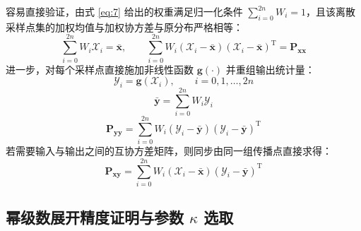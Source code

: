 容易直接验证，由式 \eqref{eq:7} 给出的权重满足归一化条件 $\sum_{i=0}^{2n} W_i = 1$，且该离散采样点集的加权均值与加权协方差与原分布严格相等：
\begin{equation}\label{eq:8}
\sum_{i=0}^{2n} W_i \mathcal{X}_i = \bar{\bm{x}}, \qquad \sum_{i=0}^{2n} W_i (\mathcal{X}_i - \bar{\bm{x}})(\mathcal{X}_i - \bar{\bm{x}})^{\mathrm{T}} = \bm{P}_{\bm{x}\bm{x}}
\end{equation}
进一步，对每个采样点直接施加非线性函数 $\bm{g}(\cdot)$ 并重组输出统计量：
\begin{equation}\label{eq:9}
\mathcal{Y}_i = \bm{g}(\mathcal{X}_i), \qquad i = 0, 1, \dots, 2n
\end{equation}
\begin{equation}\label{eq:10}
\bar{\bm{y}} = \sum_{i=0}^{2n} W_i \mathcal{Y}_i
\end{equation}
\begin{equation}\label{eq:11}
\bm{P}_{\bm{y}\bm{y}} = \sum_{i=0}^{2n} W_i (\mathcal{Y}_i - \bar{\bm{y}})(\mathcal{Y}_i - \bar{\bm{y}})^{\mathrm{T}}
\end{equation}
若需要输入与输出之间的互协方差矩阵，则同步由同一组传播点直接求得：
\begin{equation}\label{eq:12}
\bm{P}_{\bm{x}\bm{y}} = \sum_{i=0}^{2n} W_i (\mathcal{X}_i - \bar{\bm{x}})(\mathcal{Y}_i - \bar{\bm{y}})^{\mathrm{T}}
\end{equation}

\subsection{幂级数展开精度证明与参数 $\kappa$ 选取}\label{sec:ut-accuracy}

